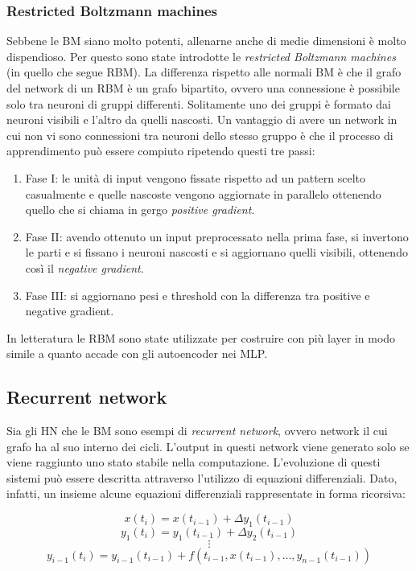 \documentclass[10pt,a4paper]{article}
\begin{document}
\subsubsection{Restricted Boltzmann machines}

 Sebbene le BM siano molto potenti, allenarne anche di medie dimensioni è molto dispendioso. Per questo sono state introdotte le \emph{restricted Boltzmann machines} (in quello che segue RBM). La differenza rispetto alle normali BM è che il grafo del network di un RBM è un grafo bipartito, ovvero una connessione è possibile solo tra neuroni di gruppi differenti. Solitamente uno dei gruppi è formato dai neuroni visibili e l'altro da quelli nascosti. Un vantaggio di avere un network in cui non vi sono connessioni tra neuroni dello stesso gruppo è che il processo di apprendimento può essere compiuto ripetendo questi tre passi:
\begin{enumerate}
\item{Fase I: le unità di input vengono fissate rispetto ad un pattern scelto casualmente e quelle nascoste vengono aggiornate in parallelo ottenendo quello che si chiama in gergo \emph{positive gradient}.}
\item{Fase II: avendo ottenuto un input preprocessato nella prima fase, si invertono le parti e si fissano i neuroni nascosti e si aggiornano quelli visibili, ottenendo così il \emph{negative gradient}.}
\item{Fase III: si aggiornano pesi e threshold con la differenza tra positive e negative gradient.}
\end{enumerate}
In letteratura le RBM sono state utilizzate per costruire con più layer in modo simile a quanto accade con gli autoencoder nei MLP.
 
\subsection{Recurrent network}

Sia gli HN che le BM sono esempi di \emph{recurrent network}, ovvero network il cui grafo ha al suo interno dei cicli. L'output in questi network viene generato solo se viene raggiunto uno stato stabile nella computazione. L'evoluzione di questi sistemi può essere descritta attraverso l'utilizzo di equazioni differenziali. Dato, infatti, un insieme alcune equazioni differenziali rappresentate in forma ricorsiva:

$$
x(t_i) = x(t_{i-1}) + \Delta y_1(t_{i-1})
$$
$$
y_1(t_i) = y_1(t_{i-1}) + \Delta y_2(t_{i-1})
$$
$$
\vdots
$$
$$
y_{i-1}(t_i) = y_{i-1}(t_{i-1}) + f(t_{i-1}, x(t_{i-1}), \dots, y_{n-1}(t_{i-1}))
$$
\end{document}
